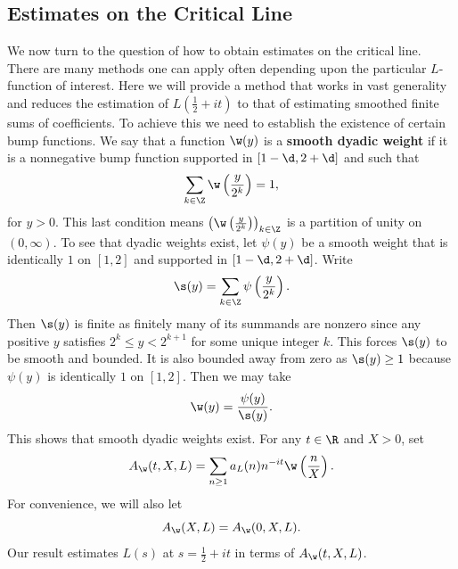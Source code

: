 \documentclass[12pt]{article}
\begin{document}
    \subsection{Estimates on the Critical Line}
      We now turn to the question of how to obtain estimates on the critical line. There are many methods one can apply often depending upon the particular \(L\)-function of interest. Here we will provide a method that works in vast generality and reduces the estimation of \(L\left(\frac{1}{2}+it\right)\) to that of estimating smoothed finite sums of coefficients. To achieve this we need to establish the existence of certain bump functions. We say that a function \(\w(y)\) is a \textbf{smooth dyadic weight} if it is a nonnegative bump function supported in \([1-\d,2+\d]\) and such that
      \[
        \sum_{k \in \Z}\w\left(\frac{y}{2^{k}}\right) = 1,
      \]
      for \(y > 0\). This last condition means \(\left(\w\left(\frac{y}{2^{k}}\right)\right)_{k \in \Z}\) is a partition of unity on \((0,\infty)\). To see that dyadic weights exist, let \(\psi(y)\) be a smooth weight that is identically \(1\) on \([1,2]\) and supported in \([1-\d,2+\d]\). Write
      \[
        \s(y) = \sum_{k \in \Z}\psi\left(\frac{y}{2^{k}}\right).
      \]
      Then \(\s(y)\) is finite as finitely many of its summands are nonzero since any positive \(y\) satisfies \(2^{k} \le y < 2^{k+1}\) for some unique integer \(k\). This forces \(\s(y)\) to be smooth and bounded. It is also bounded away from zero as \(\s(y) \ge 1\) because \(\psi(y)\) is identically \(1\) on \([1,2]\). Then we may take
      \[
        \w(y) = \frac{\psi(y)}{\s(y)}.
      \]
      This shows that smooth dyadic weights exist. For any \(t \in \R\) and \(X > 0\), set
      \[
        A_{\w}(t,X,L) = \sum_{n \ge 1}a_{L}(n)n^{-it}\w\left(\frac{n}{X}\right).
      \]
      For convenience, we will also let
      \[
        A_{\w}(X,L) = A_{\w}(0,X,L).
      \]
      Our result estimates \(L(s)\) at \(s = \frac{1}{2}+it\) in terms of \(A_{\w}(t,X,L)\).
\end{document}
